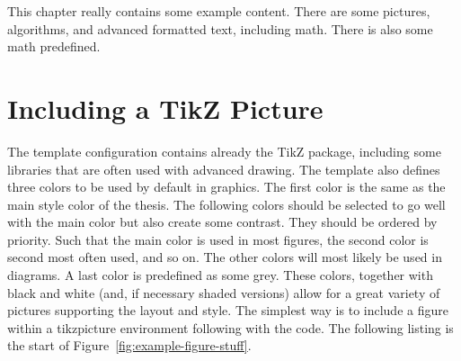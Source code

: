 \begin{chapterabstract}
  This chapter really contains some example content. There are some pictures, algorithms, and advanced formatted
  text, including math.
  There is also some math predefined.
\end{chapterabstract}

\section{Including a TikZ Picture}

The template configuration contains already the TikZ package, including some libraries that are often used with advanced drawing. The template also defines three colors to be used by default in graphics. The first color is the same as the main style color of the thesis. The following colors should be selected to go well with the main color but also create some contrast. They should be ordered by priority. Such that the main color is used in most figures, the second color is second most often used, and so on. The other colors will most likely be used in diagrams. A last color is predefined as some grey. These colors, together with black and white (and, if necessary shaded versions) allow for a great variety of pictures supporting the layout and style.
The simplest way is to include a figure within a tikzpicture environment following with the code. The following listing is the start of Figure~\ref{fig:example-figure-stuff}.

